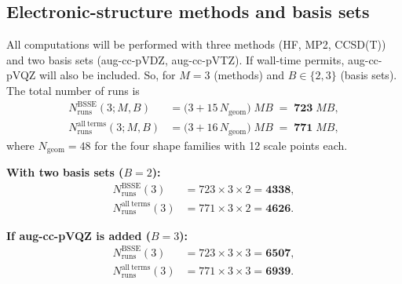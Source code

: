 \subsection*{\centering Electronic-structure methods and basis sets}

All computations will be performed with three methods
(HF, MP2, CCSD(T)) and two basis sets
(aug-cc-pVDZ, aug-cc-pVTZ). If wall-time permits,
aug-cc-pVQZ will also be included. So, for $M=3$ (methods) and $B\in\{2,3\}$ (basis sets).
The total number of runs is
\[
\boxed{
\begin{aligned}
N_{\mathrm{runs}}^{\mathrm{BSSE}}(3; M,B)
  &= \bigl(3 + 15\,N_{\mathrm{geom}}\bigr)\; M B
   \;=\; \mathbf{723}\; M B,\\[4pt]
N_{\mathrm{runs}}^{\mathrm{all\ terms}}(3; M,B)
  &= \bigl(3 + 16\,N_{\mathrm{geom}}\bigr)\; M B
   \;=\; \mathbf{771}\; M B,
\end{aligned}}
\]
where $N_{\mathrm{geom}}=48$ for the four shape families
with 12 scale points each.

\noindent\textbf{With two basis sets ($B=2$):}
\[
\boxed{
\begin{aligned}
N_{\mathrm{runs}}^{\mathrm{BSSE}}(3)
  &= 723 \times 3 \times 2 = \mathbf{4338},\\[2pt]
N_{\mathrm{runs}}^{\mathrm{all\ terms}}(3)
  &= 771 \times 3 \times 2 = \mathbf{4626}.
\end{aligned}}
\]

\noindent\textbf{If aug-cc-pVQZ is added ($B=3$):}
\[
\boxed{
\begin{aligned}
N_{\mathrm{runs}}^{\mathrm{BSSE}}(3)
  &= 723 \times 3 \times 3 = \mathbf{6507},\\[2pt]
N_{\mathrm{runs}}^{\mathrm{all\ terms}}(3)
  &= 771 \times 3 \times 3 = \mathbf{6939}.
\end{aligned}}
\]


